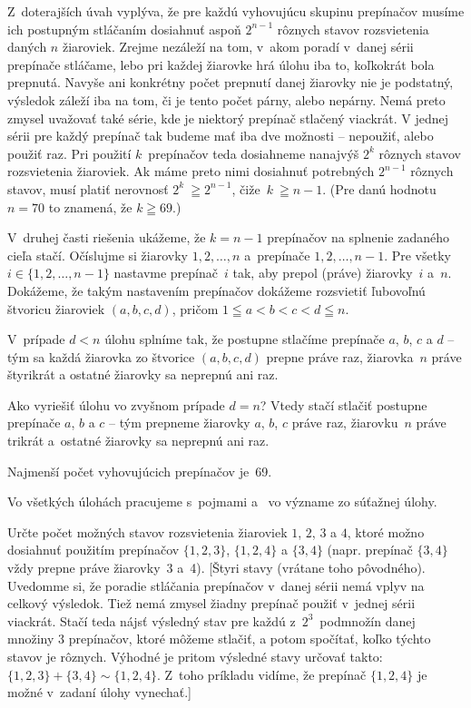 {Z~doterajších úvah vyplýva, že pre každú vyhovujúcu skupinu
prepínačov musíme ich postupným stláčaním dosiahnuť aspoň
$2^{n-1}$ rôznych stavov rozsvietenia daných $n$ žiaroviek.
Zrejme nezáleží na tom, v~akom poradí v~danej sérii prepínače
stláčame, lebo pri každej žiarovke hrá úlohu iba to, koľkokrát
bola prepnutá. Navyše ani konkrétny počet prepnutí danej žiarovky
nie je podstatný, výsledok záleží iba na tom, či je tento počet
párny, alebo nepárny. Nemá preto zmysel uvažovať také série,
kde je niektorý prepínač stlačený viackrát. V jednej sérii pre každý prepínač tak budeme mať
iba dve možnosti -- nepoužiť, alebo použiť raz.
Pri použití $k$~prepínačov teda dosiahneme nanajvýš $2^k$ rôznych
stavov rozsvietenia žiaroviek. Ak máme preto nimi dosiahnuť
potrebných $2^{n-1}$ rôznych stavov, musí platiť nerovnosť
$2^k~\geqq 2^{n-1}$, čiže~$k~\geqq n-1$.
(Pre danú hodnotu $n=70$ to znamená, že $k\geqq69$.)

V~druhej časti riešenia ukážeme, že $k=n-1$ prepínačov na splnenie
zadaného cieľa stačí. Očíslujme si žiarovky $1, 2,\ldots, n$
a~prepínače $1, 2, \ldots, n-1$. Pre všetky
$i\in\{1,2,\ldots,n-1\}$ nastavme prepínač~$i$ tak, aby prepol
(práve) žiarovky~$i$ a~$n$. Dokážeme, že takým
nastavením prepínačov dokážeme rozsvietiť ľubovoľnú štvoricu
žiaroviek $(a,b,c,d)$, pričom $1\leqq a<b<c<d\leqq n$.

V~prípade $d<n$ úlohu splníme tak, že postupne stlačíme
prepínače $a$, $b$, $c$ a $d$ -- tým sa každá žiarovka zo
štvorice $(a,b,c,d)$ prepne práve raz, žiarovka~$n$ práve
štyrikrát a ostatné žiarovky sa neprepnú ani raz.

Ako vyriešiť úlohu vo zvyšnom prípade $d=n$? Vtedy stačí stlačiť postupne
prepínače $a$, $b$ a $c$ -- tým prepneme žiarovky $a$, $b$, $c$
práve raz, žiarovku~$n$ práve trikrát a~ostatné žiarovky
sa neprepnú ani raz.

\zaver
Najmenší počet vyhovujúcich prepínačov je~69.

\titem
Vo všetkých úlohách pracujeme s~pojmami 
a~ vo význame zo súťažnej úlohy.

Určte počet možných stavov rozsvietenia žiaroviek
$1$, $2$, $3$ a $4$, ktoré možno dosiahnuť použitím prepínačov
$\{1,2,3\}$, $\{1,2,4\}$ a $\{3,4\}$ (napr. prepínač
$\{3, 4\}$ vždy prepne práve žiarovky~3 a~4).
[Štyri stavy (vrátane toho pôvodného). Uvedomme si, že
poradie stláčania prepínačov v~danej sérii
nemá vplyv na celkový výsledok. Tiež nemá zmysel žiadny
prepínač použiť v~jednej sérii viackrát.
Stačí teda nájsť výsledný stav pre každú z~$2^3$~podmnožín danej
množiny 3 prepínačov, ktoré môžeme stlačiť, a potom spočítať,
koľko týchto stavov je rôznych. Výhodné je pritom výsledné stavy
určovať takto: $\{1,2,3\}+\{3,4\}\sim\{1,2,4\}$. Z~toho príkladu
vidíme, že prepínač $\{1,2,4\}$ je možné v~zadaní úlohy vynechať.]

}
